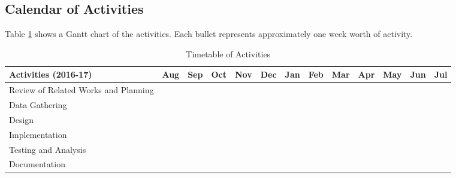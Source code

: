 \begin{landscape}
\section{Calendar of Activities}

Table \ref{tab:timetableactivities} shows a Gantt chart of the activities.  Each bullet represents approximately
one week worth of activity.

%
%
\newcommand{\weekone}{\textbullet}
\newcommand{\weektwo}{\textbullet \textbullet}
\newcommand{\weekthree}{\textbullet \textbullet \textbullet}
\newcommand{\weekfour}{\textbullet \textbullet \textbullet \textbullet}

%
%
\begin{comment}
   \newcommand{\weekone}{$\star$}
   \newcommand{\weektwo}{$\star \star$}
   \newcommand{\weekthree}{$\star \star \star$}
   \newcommand{\weekfour}{$\star \star \star \star$ }
\end{comment}


\begin{table}[ht]   %
\centering
\caption{Timetable of Activities} \vspace{0.25em}
\begin{tabular}{|p{2in}|c|c|c|c|c|c|c|c|c|c|c|c|} \hline
\centering Activities (2016-17) & Aug & Sep & Oct & Nov & Dec & Jan & Feb & Mar & Apr & May & Jun & Jul \\ \hline
Review of Related Works and Planning  & \weekfour & \weekfour & \weekfour & \weekfour &  &  &  &  &  &  &  &  \\ \hline
Data Gathering &  &  &  & \weekfour & \weektwo~~~ &  &  &  &  &  &  &  \\ \hline
Design  &  &  &  &  &  & ~~~\weekthree & \weekfour &  &  &  &  &  \\ \hline
Implementation &  &  &  &  &  &  &  & \weekfour & \weekfour & \weekfour &  &  \\ \hline
Testing and Analysis &  &  &  &  &  &  &  &  &  &  & \weekfour & \weektwo~~~ \\ \hline
Documentation & \weekfour  & \weekfour & \weekfour & \weekfour & \weektwo~~~ & ~~~\weekthree & \weekfour & \weekfour & \weekfour & \weekfour & \weekfour & \weektwo~~~ \\ \hline
\end{tabular}
\label{tab:timetableactivities}
\end{table}
\end{landscape}
